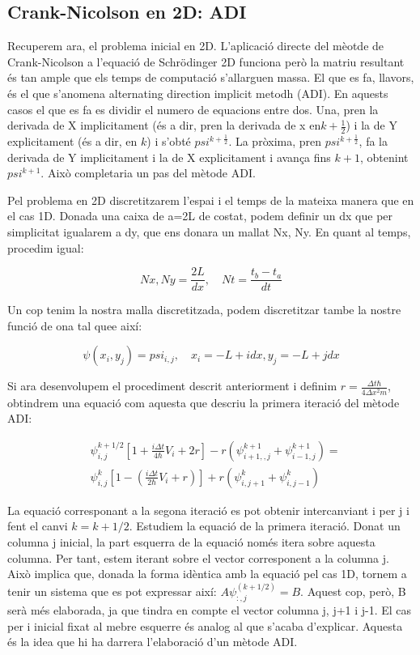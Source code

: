\documentclass{article}
\begin{document}
\subsection{Crank-Nicolson en 2D: ADI}

Recuperem ara, el problema inicial en 2D. L'aplicació directe del mèotde de Crank-Nicolson a l'equació de Schrödinger 2D funciona però la matriu resultant és tan ample que els temps de computació s'allarguen massa. El que es fa, llavors, és el que s'anomena alternating direction implicit metodh (ADI). En aquests casos el que es fa es dividir el numero de equacions entre dos. Una, pren la derivada de X implicitament (és a dir, pren la derivada de x en\(k+\frac{1}{2}\)) i la de Y explicitament (és a dir, en \(k\)) i s'obté \(psi^{k+\frac{1}{2}}\). La pròxima, pren \(psi^{k+\frac{1}{2}}\), fa la derivada de Y implicitament i la de X explicitament i avança fins \(k+1\), obtenint \(psi^{k+1}\). Això completaria un pas del mètode ADI. 

Pel problema en 2D discretitzarem l'espai i el temps de la mateixa manera que en el cas 1D. Donada una caixa de a=2L de costat, podem definir un dx que per simplicitat igualarem a dy, que ens donara un mallat Nx, Ny. En quant al temps, procedim igual:

\begin{equation}
Nx,Ny=\frac{2L}{dx}, \quad Nt=\frac{t_b-t_a}{dt}
\end{equation}

Un cop tenim la nostra malla discretitzada, podem discretitzar tambe la nostre funció de ona tal quee així:

\begin{equation}
\psi(x_i,y_j)=psi_{i,j}, \quad x_i=-L+idx,y_j=-L+jdx
\end{equation}

Si ara desenvolupem el procediment descrit anteriorment i definim \(r=\frac{\Delta t \hbar}{4\Delta x^2 m}\), obtindrem una equació com aquesta que descriu la primera iteració del mètode ADI:

\begin{align}
&\psi_{i,j}^{k+1/2}[1+\frac{i\Delta t}{4\hbar}V_i+2r]-r(\psi_{i+1,,j}^{k+1}+\psi_{i-1,j}^{k+1}) = \\
&\psi_{i,j}^{k}[1-(\frac{i\Delta t}{2\hbar}V_i+r)]+r(\psi_{i,j+1}^{k}+\psi_{i,j-1}^{k})
\end{align}

La equació corresponant a la segona iteració es pot obtenir intercanviant i per j i fent el canvi \(k=k+1/2 \). Estudiem la equació de la primera iteració. Donat un columna j inicial, la part esquerra de la equació només itera sobre aquesta columna. Per tant, estem iterant sobre el vector corresponent a la columna j. Això implica que, donada la forma idèntica amb la equació pel cas 1D, tornem a tenir un sistema que es pot expressar així: \(A\psi_{:,j}^(k+1/2)=B\). Aquest cop, però, B serà més elaborada, ja que tindra en compte el vector columna j, j+1 i j-1. El cas per i inicial fixat al mebre esquerre és analog al que s'acaba d'explicar. Aquesta és la idea que hi ha darrera l'elaboració d'un mètode ADI. 
\end{document}
